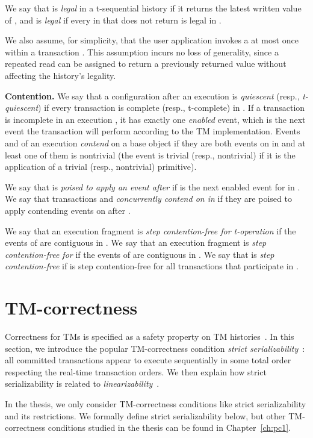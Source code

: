 We say that  is \emph{legal} in a t-sequential history  
if it returns the latest written value of , and  is \emph{legal}
if every  in  that does not return  is legal in .

We also assume, for simplicity, that the user application invokes a 
at most once within a transaction .
This assumption incurs no loss of generality,
since a repeated read can be assigned to return a previously returned
value without affecting the history's legality.

\vspace{1mm}\noindent\textbf{Contention.}
We say that a configuration  after an execution  is \emph{quiescent} (resp., \emph{t-quiescent})
if every transaction  is complete (resp., t-complete) in .
If a transaction  is incomplete in an execution , it has exactly one \emph{enabled} event, 
which is the next event the transaction will perform according to the TM implementation.
Events  and  of an execution   \emph{contend} on a base
object  if they are both events on  in  and at least 
one of them is nontrivial (the event is trivial (resp., nontrivial) 
if it is the application of a trivial (resp., nontrivial) primitive).


We say that  is \emph{poised to apply an event  after } if  is the next enabled event for  in .
We say that transactions  and  \emph{concurrently contend on  in } 
if they are poised to apply contending events on  after .

We say that an execution fragment  is \emph{step contention-free for t-operation } if the events of  
are contiguous in .
We say that an execution fragment  is \emph{step contention-free for } if the events of  are contiguous in .
We say that  is \emph{step contention-free} if  is step contention-free for all transactions that participate in .
\section{TM-correctness}
\label{sec:tm-correctness}
Correctness for TMs is specified as a safety property on TM histories~\cite{OL82,AS85,Lyn96}.
In this section, we introduce the popular TM-correctness condition \emph{strict serializability}~\cite{Pap79-serial}:
all committed transactions appear to execute sequentially in some total order respecting the real-time transaction orders.
We then explain how strict serializability is related to \emph{linearizability}~\cite{HW90}.

In the thesis, we only consider TM-correctness conditions like strict serializability and its restrictions.
We formally define strict serializability below, but other TM-correctness conditions studied in the
thesis can be found in Chapter~\ref{ch:pc1}.

